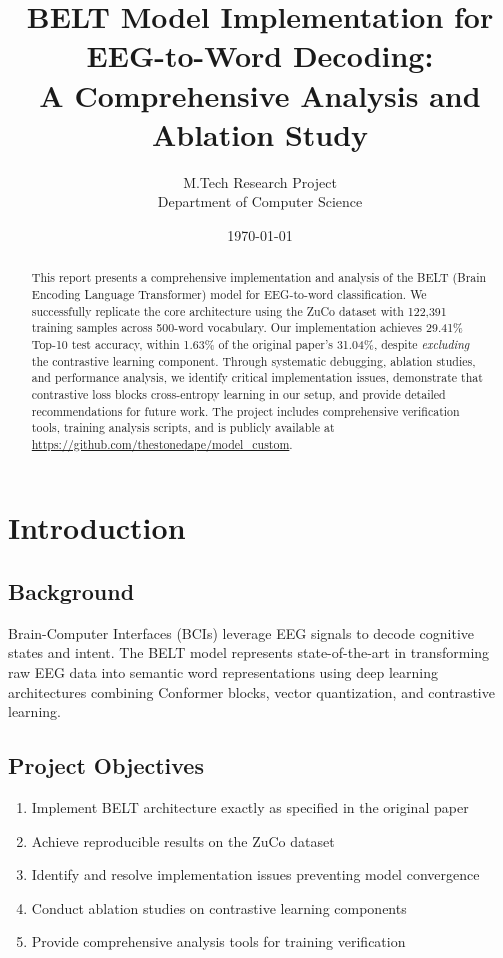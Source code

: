 \documentclass[12pt,a4paper]{article}
\title{\textbf{BELT Model Implementation for EEG-to-Word Decoding:\\
A Comprehensive Analysis and Ablation Study}}
\author{
M.Tech Research Project\\
Department of Computer Science\\
\vspace{0.5cm}
}
\date{\today}
\begin{document}
\maketitle

\begin{abstract}
This report presents a comprehensive implementation and analysis of the BELT (Brain Encoding Language Transformer) model for EEG-to-word classification. We successfully replicate the core architecture using the ZuCo dataset with 122,391 training samples across 500-word vocabulary. Our implementation achieves 29.41\% Top-10 test accuracy, within 1.63\% of the original paper's 31.04\%, despite \textit{excluding} the contrastive learning component. Through systematic debugging, ablation studies, and performance analysis, we identify critical implementation issues, demonstrate that contrastive loss blocks cross-entropy learning in our setup, and provide detailed recommendations for future work. The project includes comprehensive verification tools, training analysis scripts, and is publicly available at \url{https://github.com/thestonedape/model\_custom}.
\end{abstract}

\tableofcontents
\newpage

\section{Introduction}

\subsection{Background}
Brain-Computer Interfaces (BCIs) leverage EEG signals to decode cognitive states and intent. The BELT model represents state-of-the-art in transforming raw EEG data into semantic word representations using deep learning architectures combining Conformer blocks, vector quantization, and contrastive learning.

\subsection{Project Objectives}
\begin{enumerate}
    \item Implement BELT architecture exactly as specified in the original paper
    \item Achieve reproducible results on the ZuCo dataset
    \item Identify and resolve implementation issues preventing model convergence
    \item Conduct ablation studies on contrastive learning components
    \item Provide comprehensive analysis tools for training verification
\end{enumerate}
\end{document}

